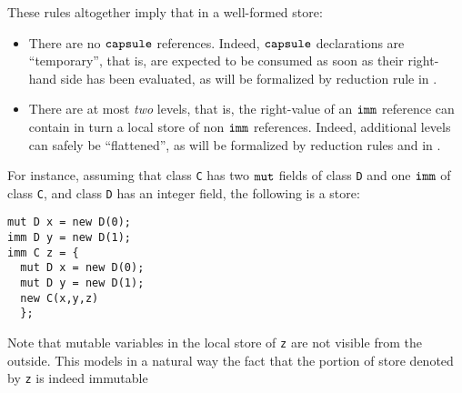 These rules {altogether} imply that in a well-formed store:
\begin{itemize}
\item There are no $\texttt{capsule}$ references. Indeed, $\texttt{capsule}$ declarations are ``temporary'', that is, are expected to be consumed as soon as their right-hand side has been evaluated, as will be formalized by reduction rule  in .
\item  There are at most \emph{two} levels, that is, the right-value of an $\texttt{imm}$ reference can contain in turn a local store of non $\texttt{imm}$ references. Indeed, additional levels can safely be ``flattened'', as will be formalized by reduction rules  and  in .
\end{itemize}
For instance, assuming that class \lstinline{C} has two $\texttt{mut}$  fields of class \lstinline{D} and one $\texttt{imm}$ of class \lstinline{C}{}, and class  \lstinline{D} has an integer field, the following is a store:
\begin{small}
\begin{lstlisting}
mut D x = new D(0);
imm D y = new D(1);
imm C z = { 
  mut D x = new D(0);
  mut D y = new D(1);
  new C(x,y,z) 
  };
\end{lstlisting}
\end{small}
Note that mutable variables in the local store of \lstinline{z}{} are not visible from the outside. 
This models in a natural way the fact that the portion of store denoted by  \lstinline{z}{} is indeed immutable

